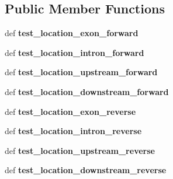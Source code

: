 \subsection*{Public Member Functions}
\begin{DoxyCompactItemize}
\item 
\hypertarget{classgene_1_1_gene_test_a8748a3d66c9c09a533df5932a79c5cf1}{def {\bfseries test\+\_\+location\+\_\+exon\+\_\+forward}}\label{classgene_1_1_gene_test_a8748a3d66c9c09a533df5932a79c5cf1}

\item 
\hypertarget{classgene_1_1_gene_test_a8c90d274635f61e50aad2f591b966ce7}{def {\bfseries test\+\_\+location\+\_\+intron\+\_\+forward}}\label{classgene_1_1_gene_test_a8c90d274635f61e50aad2f591b966ce7}

\item 
\hypertarget{classgene_1_1_gene_test_a3d7f2c883084688cf189d2164c45d1ef}{def {\bfseries test\+\_\+location\+\_\+upstream\+\_\+forward}}\label{classgene_1_1_gene_test_a3d7f2c883084688cf189d2164c45d1ef}

\item 
\hypertarget{classgene_1_1_gene_test_a770d7f020115c7fbf672b202777799a7}{def {\bfseries test\+\_\+location\+\_\+downstream\+\_\+forward}}\label{classgene_1_1_gene_test_a770d7f020115c7fbf672b202777799a7}

\item 
\hypertarget{classgene_1_1_gene_test_ab802589cf72702568db73d204175d51d}{def {\bfseries test\+\_\+location\+\_\+exon\+\_\+reverse}}\label{classgene_1_1_gene_test_ab802589cf72702568db73d204175d51d}

\item 
\hypertarget{classgene_1_1_gene_test_a82df44ffd0b6b0a929c5aea1e2357958}{def {\bfseries test\+\_\+location\+\_\+intron\+\_\+reverse}}\label{classgene_1_1_gene_test_a82df44ffd0b6b0a929c5aea1e2357958}

\item 
\hypertarget{classgene_1_1_gene_test_a19cf63df4ca1cc366a26174dcd0ad11e}{def {\bfseries test\+\_\+location\+\_\+upstream\+\_\+reverse}}\label{classgene_1_1_gene_test_a19cf63df4ca1cc366a26174dcd0ad11e}

\item 
\hypertarget{classgene_1_1_gene_test_a882d809591797ca533e96f6bb85f5ce6}{def {\bfseries test\+\_\+location\+\_\+downstream\+\_\+reverse}}\label{classgene_1_1_gene_test_a882d809591797ca533e96f6bb85f5ce6}

\end{DoxyCompactItemize}
